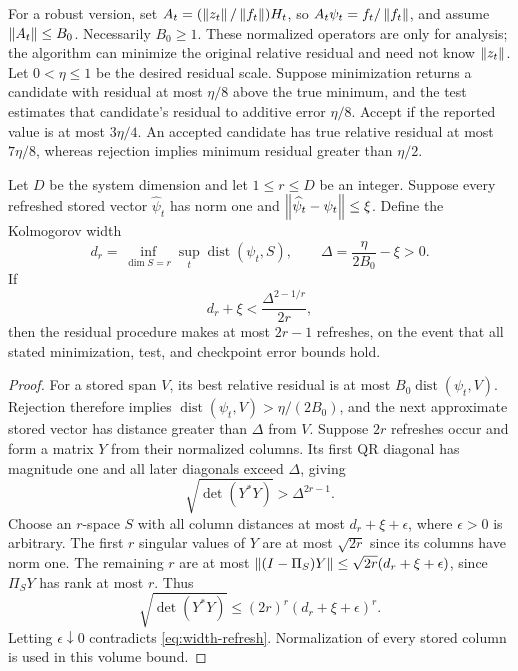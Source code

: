 For a robust version, set
$A_t=(\left\lVert z_t\right\rVert/\left\lVert f_t\right\rVert)H_t$, so
$A_t\psi_t=f_t/\left\lVert f_t\right\rVert$, and assume $\left\lVert A_t\right\rVert\leq B_0$.
Necessarily $B_0\geq1$.  These normalized operators are only for
analysis; the algorithm can minimize the original relative residual and
need not know $\left\lVert z_t\right\rVert$.  Let $0<\eta\leq1$ be the desired residual
scale.  Suppose minimization returns a candidate with residual at most
$\eta/8$ above the true minimum, and the test estimates that candidate's
residual to additive error $\eta/8$.  Accept if the reported value is at
most $3\eta/4$.  An accepted candidate has true relative residual at
most $7\eta/8$, whereas rejection implies minimum residual greater than
$\eta/2$.

\begin{theorem}\label{thm:robust-reuse}
Let $D$ be the system dimension and let $1\leq r\leq D$ be an integer.
Suppose every refreshed stored vector $\widehat\psi_t$ has norm one and
$\left\lVert\widehat\psi_t-\psi_t\right\rVert\leq\xi$.  Define the Kolmogorov width
\[
 d_r=\inf_{\dim S=r}\sup_t\operatorname{dist}(\psi_t,S),
 \qquad \Delta=\frac{\eta}{2B_0}-\xi>0.
\]
If
\begin{equation}\label{eq:width-refresh}
 d_r+\xi<\frac{\Delta^{2-1/r}}{2r},
\end{equation}
then the residual procedure makes at most $2r-1$ refreshes, on the event
that all stated minimization, test, and checkpoint error bounds hold.
\end{theorem}
\begin{proof}
For a stored span $V$, its best relative residual is at most
$B_0\operatorname{dist}(\psi_t,V)$.  Rejection therefore implies
$\operatorname{dist}(\psi_t,V)>\eta/(2B_0)$, and the next approximate
stored vector has distance greater than $\Delta$ from $V$.
Suppose $2r$ refreshes occur and form a matrix $Y$ from their normalized
columns.  Its first QR diagonal has magnitude one and all later diagonals
exceed $\Delta$, giving
\[
 \sqrt{\det(Y^*Y)}>\Delta^{2r-1}.
\]
Choose an $r$-space $S$ with all column distances at most
$d_r+\xi+\epsilon$, where $\epsilon>0$ is arbitrary.
The first $r$ singular values of $Y$ are at most $\sqrt{2r}$ since its
columns have norm one.  The remaining $r$ are at most
$\left\lVert(I-\Pi_S)Y\right\rVert\leq\sqrt{2r}(d_r+\xi+\epsilon)$, since
$\Pi_SY$ has rank at most $r$.  Thus
\[
 \sqrt{\det(Y^*Y)}\leq(2r)^r(d_r+\xi+\epsilon)^r.
\]
Letting $\epsilon\downarrow0$ contradicts \eqref{eq:width-refresh}.
Normalization of every stored column is used in this volume bound.
\end{proof}


